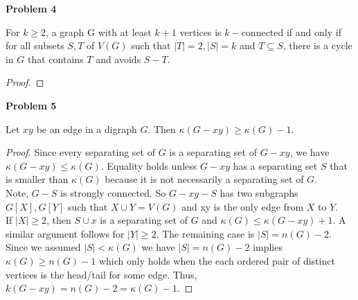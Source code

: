 \documentclass{article}
\newenvironment{claim}[2][Claim]{\begin{trivlist}
		\item[\hskip \labelsep {\bfseries #1}\hskip \labelsep {\bfseries #2}]}{\end{trivlist}}
\begin{document}
\noindent \textbf{Problem 4}
\begin{claim}{}
For $k \geq 2$, a graph G with at least $k + 1$ vertices is $k-$connected if and only if for all subsets $S, T$ of $V (G)$ such that $|T| = 2, |S| = k$ and $T \subseteq S$, there is a cycle in $G$ that contains $T$ and avoids $S - T$.
\end{claim}
\begin{proof}
\end{proof}

\noindent \textbf{Problem 5}
\begin{claim}{}
Let $xy$ be an edge in a digraph $G$. Then $\kappa(G - xy) \geq \kappa(G) - 1$.
\end{claim}
\begin{proof}
Since every separating set of $G$ is a separating set of $G - xy$, we have $\kappa(G - xy) \leq \kappa(G)$. Equality holds unless $G - xy$ has a separating set $S$ that is smaller than $\kappa(G)$ because it is not necessarily a separating set of $G$.\\
Note, $G - S$ is strongly connected. So $G - xy - S$ has two subgraphs $G[X],G[Y]$ such that $X \cup Y = V(G)$ and xy is the only edge from $X$ to $Y$. \\
If $|X| \geq 2$, then $S \cup x$ is a separating set of $G$ and $\kappa(G) \leq \kappa(G - xy) + 1$. A similar argument follows for $|Y| \geq 2$. The remaining case is $|S| = n(G) - 2$. Since we assumed $|S| < \kappa(G)$ we have $|S| = n(G) - 2$ implies $\kappa(G) \geq n(G) - 1$ which only holds when the each ordered pair of distinct vertices is the head/tail for some edge. Thus, $k(G - xy) = n(G) - 2 = \kappa(G) - 1$. 

\end{proof}
\end{document}
